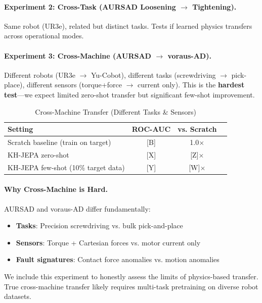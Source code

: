 \documentclass{article}
\begin{document}
\paragraph{Experiment 2: Cross-Task (AURSAD Loosening $\rightarrow$ Tightening).}
Same robot (UR3e), related but distinct tasks. Tests if learned physics transfers across operational modes.

\paragraph{Experiment 3: Cross-Machine (AURSAD $\rightarrow$ voraus-AD).}
Different robots (UR3e $\rightarrow$ Yu-Cobot), different tasks (screwdriving $\rightarrow$ pick-place), different sensors (torque+force $\rightarrow$ current only). This is the \textbf{hardest test}—we expect limited zero-shot transfer but significant few-shot improvement.

\begin{table}[h]
\centering
\caption{Cross-Machine Transfer (Different Tasks \& Sensors)}
\small
\begin{tabular}{@{}lccc@{}}
\toprule
\textbf{Setting} & \textbf{ROC-AUC} & \textbf{vs. Scratch} \\
\midrule
Scratch baseline (train on target) & [B] & 1.0$\times$ \\
KH-JEPA zero-shot & [X] & [Z]$\times$ \\
KH-JEPA few-shot (10\% target data) & [Y] & [W]$\times$ \\
\bottomrule
\end{tabular}
\end{table}

\paragraph{Why Cross-Machine is Hard.} AURSAD and voraus-AD differ fundamentally:
\begin{itemize}
    \item \textbf{Tasks}: Precision screwdriving vs. bulk pick-and-place
    \item \textbf{Sensors}: Torque + Cartesian forces vs. motor current only
    \item \textbf{Fault signatures}: Contact force anomalies vs. motion anomalies
\end{itemize}
We include this experiment to honestly assess the limits of physics-based transfer. True cross-machine transfer likely requires multi-task pretraining on diverse robot datasets.
\end{document}

